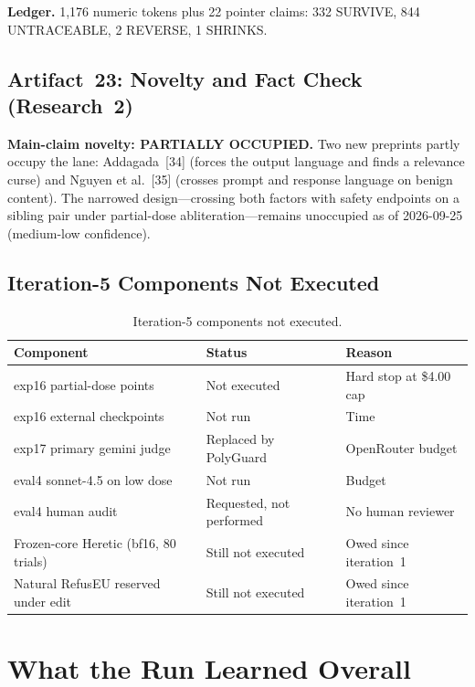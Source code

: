 \documentclass[11pt,letterpaper]{article}
\begin{document}
\textbf{Ledger.} 1,176 numeric tokens plus 22 pointer claims: 332 SURVIVE, 844 UNTRACEABLE, 2 REVERSE, 1 SHRINKS.


\subsection{Artifact~23: Novelty and Fact Check (Research~2)}
\label{gen_art_research_2}

\textbf{Main-claim novelty: PARTIALLY OCCUPIED.} Two new preprints partly occupy the lane: Addagada~[34] (forces the output language and finds a relevance curse) and Nguyen et al.~[35] (crosses prompt and response language on benign content). The narrowed design---crossing both factors with safety endpoints on a sibling pair under partial-dose abliteration---remains unoccupied as of 2026-09-25 (medium-low confidence).


\subsection{Iteration-5 Components Not Executed}

\begin{table}[!htbp]
\centering
\caption{Iteration-5 components not executed.}
\label{tab:not_exec_iter5}
{\small
\begin{tabularx}{\linewidth}{lXl}
\toprule
Component & Status & Reason \\
\midrule
exp16 partial-dose points & Not executed & Hard stop at \$4.00 cap \\
exp16 external checkpoints & Not run & Time \\
exp17 primary gemini judge & Replaced by PolyGuard & OpenRouter budget \\
eval4 sonnet-4.5 on low dose & Not run & Budget \\
eval4 human audit & Requested, not performed & No human reviewer \\
Frozen-core Heretic (bf16, 80 trials) & Still not executed & Owed since iteration~1 \\
Natural RefusEU reserved under edit & Still not executed & Owed since iteration~1 \\
\bottomrule
\end{tabularx}
}
\end{table}


\section{What the Run Learned Overall}
\end{document}
